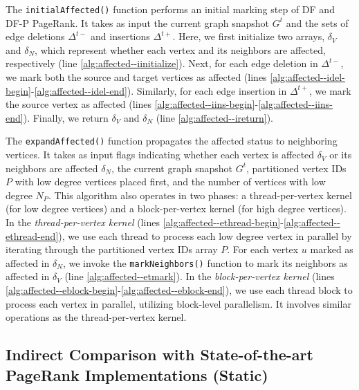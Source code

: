 The \texttt{initialAffected()} function performs an initial marking step of DF and DF-P PageRank. It takes as input the current graph snapshot $G^t$ and the sets of edge deletions $\Delta^{t-}$ and insertions $\Delta^{t+}$. Here, we first initialize two arrays, $\delta_V$ and $\delta_N$, which represent whether each vertex and its neighbors are affected, respectively (line \ref{alg:affected--iinitialize}). Next, for each edge deletion in $\Delta^{t-}$, we mark both the source and target vertices as affected (lines \ref{alg:affected--idel-begin}-\ref{alg:affected--idel-end}). Similarly, for each edge insertion in $\Delta^{t+}$, we mark the source vertex as affected (lines \ref{alg:affected--iins-begin}-\ref{alg:affected--iins-end}). Finally, we return $\delta_V$ and $\delta_N$ (line \ref{alg:affected--ireturn}).

The \texttt{expandAffected()} function propagates the affected status to neighboring vertices. It takes as input flags indicating whether each vertex is affected $\delta_V$ or its neighbors are affected $\delta_N$, the current graph snapshot $G^t$, partitioned vertex IDs $P$ with low degree vertices placed first, and the number of vertices with low degree $N_P$. This algorithm also operates in two phases: a thread-per-vertex kernel (for low degree vertices) and a block-per-vertex kernel (for high degree vertices). In the \textit{thread-per-vertex kernel} (lines \ref{alg:affected--ethread-begin}-\ref{alg:affected--ethread-end}), we use each thread to process each low degree vertex in parallel by iterating through the partitioned vertex IDs array $P$. For each vertex $u$ marked as affected in $\delta_N$, we invoke the \texttt{markNeighbors()} function to mark its neighbors as affected in $\delta_V$ (line \ref{alg:affected--etmark}). In the \textit{block-per-vertex kernel} (lines \ref{alg:affected--eblock-begin}-\ref{alg:affected--eblock-end}), we use each thread block to process each vertex in parallel, utilizing block-level parallelism. It involves similar operations as the thread-per-vertex kernel.













\subsection{Indirect Comparison with State-of-the-art PageRank Implementations (Static)}
\label{sec:static-comparison-indirect}

